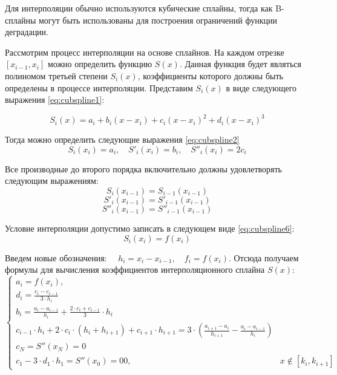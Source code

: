 Для интерполяции обычно используются кубические сплайны, тогда как B-сплайны могут быть использованы для построения ограничений функции деградации.

Рассмотрим процесс интерполяции на основе сплайнов.
На каждом отрезке $[x_{i - 1},x_{i}]$ можно определить функцию $S(x)$.
Данная функция будет являться полиномом третьей степени $S_i(x)$, коэффициенты которого должны быть определены в процессе интерполяции. 
Представим $S_i(x)$ в виде следующего выражения \ref{eq:cubspline1}:

\begin{equation} \label{eq:cubspline1}
    S_i(x) = a_i + b_i(x - x_i) + {c_i}(x-x_i)^2 + {d_i}(x - x_i)^3
\end{equation}

Тогда можно определить следующие выражения \ref{eq:cubspline2}
\begin{equation} \label{eq:cubspline1}
    S_i\left(x_i\right) = a_i, \quad S'_i(x_i) = b_i, \quad S''_i(x_i) = 2c_i
\end{equation}

Все производные до второго порядка включительно должны удовлетворять следующим выражениям:
\begin{equation} \label{eq:cubspline3}
    S_i\left(x_{i-1}\right) = S_{i-1}(x_{i-1})
\end{equation}
\begin{equation} \label{eq:cubspline4}
    S'_i\left(x_{i-1}\right) = S'_{i-1}(x_{i-1})
\end{equation}
\begin{equation} \label{eq:cubspline5}
    S''_i\left(x_{i-1}\right) = S''_{i-1}(x_{i-1})
\end{equation}

Условие интерполяции допустимо записать в следующем виде \ref{eq:cubspline6}:
\begin{equation} \label{eq:cubspline6}
    S_i\left(x_{i}\right) = f(x_{i})
\end{equation}

Введем новые обозначения: $\quad h_i = x_i - x_{i-1}, \quad f_{i} = f(x_{i})$. 
Отсюда получаем формулы для вычисления коэффициентов интерполяционного сплайна $S(x)$:
\begin{equation} \label{eq:cubspline7}
\begin{cases} 
a_{i} = f(x_{i}), \\ 
d_{i} = \frac{c_{i} - c_{i - 1}}{3 \cdot h_{i}} \\
b_{i} = \frac{a_{i} - a_{i - 1}}{h_{i}} + \frac{2 \cdot c_{i} + c_{i - 1}}{3} \cdot h_{i} \\
c_{i - 1} \cdot h_{i} + 2 \cdot c_{i} \cdot(h_{i} + h_{i+1}) + c_{i + 1} \cdot h_{i+1} = 3 \cdot \left(\frac{a_{i+1} - a_{i}}{h_{i+1}} - \frac{a_{i} - a_{i - 1}}{h_{i}}\right) \\
c_{N} = S''(x_{N}) = 0 \\
c_{1} - 3 \cdot d_{1} \cdot h_{1} = S''(x_{0}) = 0
0, & x \notin [k_i,k_{i+1}]
\end{cases}
\end{equation}

